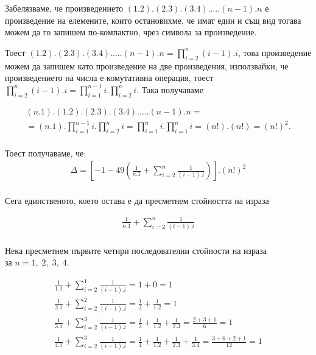 \documentclass[a4paper, 12pt]{article}
\begin{document}
    Забелязваме, че произведението $(1.2).(2.3).(3.4).\dots.(n - 1).n$
    е произведение на елемените, които остановихме, че имат един и същ вид
    тогава можем да го запишем по-компактно, чрез символа за произведение.

    Тоест $(1.2).(2.3).(3.4).\dots.(n - 1).n = \displaystyle\prod_{i = 2}^n (i - 1).i$,
    това произведение можем да запишем като произведение на две произведения, използвайки, че
    произведението на числа е комутативна операция, тоест
    $\displaystyle\prod_{i = 2}^n (i - 1).i = \displaystyle\prod_{i = 1}^{n - 1}i.\displaystyle\prod_{i = 2}^ni$.
    Така получаваме
    
    \begin{align*}
        (n.1).(1.2).(2.3).(3.4).\dots.(n - 1).n = \\
        = (n.1).\displaystyle\prod_{i = 1}^{n - 1}i.\displaystyle\prod_{i = 2}^ni
        = \displaystyle\prod_{i = 1}^ni.\displaystyle\prod_{i = 1}^ni = (n!).(n!) = (n!)^2.
    \end{align*} \\

    Тоест получаваме, че: \\

    \begin{align*}
        \Delta = \left[-1 -49\left(\frac{1}{n.1} + \displaystyle\sum_{i = 2}^n \frac{1}{(i - 1).i}\right)\right].(n!)^2
    \end{align*} \\

    Сега единственото, което остава е да пресметнем стойността на израза
    
    \begin{align*}
        \frac{1}{n.1} + \displaystyle\sum_{i = 2}^n \frac{1}{(i - 1).i}
    \end{align*} \\
    
    Нека пресметнем първите четири последователни стойности на израза\\
    за $n = 1, \; 2, \; 3, \; 4$.
    
    \begin{align*}
        \frac{1}{1.1} + \displaystyle\sum_{i = 2}^1 \frac{1}{(i - 1).i} = 1 + 0 = 1\\
        \frac{1}{2.1} + \displaystyle\sum_{i = 2}^2 \frac{1}{(i - 1).i} = \frac{1}{2} + \frac{1}{1.2} = 1\\
        \frac{1}{3.1} + \displaystyle\sum_{i = 2}^3 \frac{1}{(i - 1).i} = \frac{1}{3} + \frac{1}{1.2} + \frac{1}{2.3} = \frac{2 + 3 + 1}{6} = 1\\
        \frac{1}{4.1} + \displaystyle\sum_{i = 2}^3 \frac{1}{(i - 1).i} = \frac{1}{4} + \frac{1}{1.2} + \frac{1}{2.3} + \frac{1}{3.4} = \frac{3 + 6 + 2 + 1}{12} = 1
    \end{align*} \\
\end{document}
